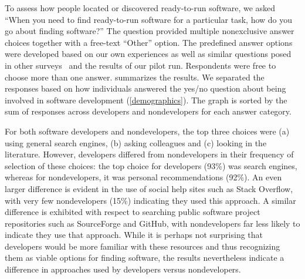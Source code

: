 \documentclass{casicswhitepaper}
\begin{document}
To assess how people located or discovered ready-to-run software, we asked ``When you need to find ready-to-run software for a particular task, how do you go about finding software?''  The question provided multiple nonexclusive answer choices together with a free-text ``Other'' option.  The predefined answer options were developed based on our own experiences as well as similar questions posed in other surveys~\cite{sim_2011, bajrachary_2009, linstead_2009} and the results of our pilot run.  Respondents were free to choose more than one answer.   summarizes the results.  We separated the responses based on how individuals answered the yes/no question about being involved in software development (\ref{demographics}).  The graph is sorted by the sum of responses across developers and nondevelopers for each answer category.

For both software developers and nondevelopers, the top three choices were (a) using general search engines, (b) asking colleagues and (c) looking in the literature.  However, developers differed from nondevelopers in their frequency of selection of these choices: the top choice for developers (93\%) was search engines, whereas for nondevelopers, it was personal recommendations (92\%).  An even larger difference is evident in the use of social help sites such as Stack Overflow, with very few nondevelopers (15\%) indicating they used this approach.  A similar difference is exhibited with respect to searching public software project repositories such as SourceForge and GitHub, with nondevelopers far less likely to indicate they use that approach.  While it is perhaps not surprising that developers would be more familiar with these resources and thus recognizing them as viable options for finding software, the results nevertheless indicate a difference in approaches used by developers versus nondevelopers.

\end{document}
